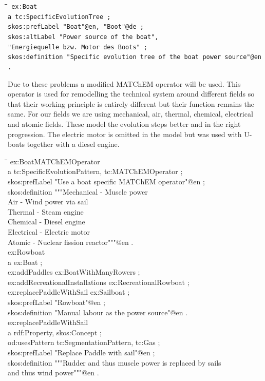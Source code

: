 \documentclass[11pt,a4paper]{article}
\newenvironment{code}{\tt \begin{tabbing}
\hskip12pt\=\hskip12pt\=\hskip12pt\=\hskip12pt\=\hskip5cm\=\hskip5cm\=\kill}
{\end{tabbing}}
\begin{document}
\begin{code}\tt
ex:Boat \\
\> a tc:SpecificEvolutionTree ; \\
\> skos:prefLabel "Boat"@en, "Boot"@de ; \\
\> skos:altLabel "Power source of the boat", \\
\>\> "Energiequelle bzw. Motor des Boots" ; \\
\> skos:definition "Specific evolution tree of the boat power source"@en . \\
\end{code}

Due to these problems a modified MATChEM operator will be used. This operator
is used for remodelling the technical system around different fields so that
their working principle is entirely different but their function remains the
same. For our fields we are using mechanical, air, thermal, chemical,
electrical and atomic fields. These model the evolution steps better and in
the right progression. The electric motor is omitted in the model but was used
with U-boats together with a diesel engine.

\begin{code}
ex:BoatMATChEMOperator\\
\> a tc:SpecificEvolutionPattern, tc:MATChEMOperator ;\\
\> skos:prefLabel "Use a boat specific MATChEM operator"@en ;\\
\> skos:definition """Mechanical - Muscle power\\
\> Air - Wind power via sail\\
\> Thermal - Steam engine\\
\> Chemical - Diesel engine\\
\> Electrical - Electric motor\\
\> Atomic - Nuclear fission reactor"""@en .\\
ex:Rowboat \\
\> a ex:Boat ; \\ 
\> ex:addPaddles ex:BoatWithManyRowers ; \\
\> ex:addRecreationalInstallations ex:RecreationalRowboat ; \\
\> ex:replacePaddleWithSail ex:Sailboat ; \\
\> skos:prefLabel "Rowboat"@en ; \\
\> skos:definition "Manual labour as the power source"@en . \\
ex:replacePaddleWithSail \\
\> a rdf:Property, skos:Concept ; \\
\> od:usesPattern tc:SegmentationPattern, tc:Gas ; \\
\> skos:prefLabel "Replace Paddle with sail"@en ; \\
\> skos:definition """Rudder and thus muscle power is replaced by sails \\
\>\> and thus wind power"""@en .
    
\end{code}
\end{document}
